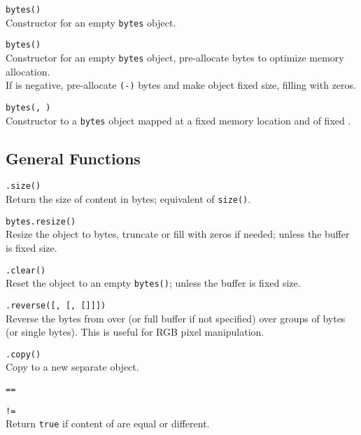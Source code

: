 \hangpar \texttt{bytes()}\\
Constructor for an empty \texttt{bytes} object.

\hangpar \texttt{bytes(}\texttt{)}\\
Constructor for an empty \texttt{bytes} object, pre-allocate  bytes to optimize memory allocation.\\
If  is negative, pre-allocate \texttt{(-}\texttt{)} bytes and make object fixed size, filling with zeros.

\hangpar \texttt{bytes(}\texttt{, }\texttt{)}\\
Constructor to a \texttt{bytes} object mapped at a fixed memory location  and of fixed . 

\subsection*{General Functions}

\hangpar {}\texttt{.size()}\\
Return the size of content in bytes; equivalent of \texttt{size(}\texttt{)}.

\hangpar \texttt{bytes.resize(}\texttt{)} \\
Resize the object to  bytes, truncate or fill with zeros if needed; unless the buffer is fixed size.

\hangpar {}\texttt{.clear()}\\
Reset the object to an empty \texttt{bytes()}; unless the buffer is fixed size.

\hangpar {}\texttt{.reverse([}\texttt{, [}\texttt{, [}\texttt{]]])}\\
Reverse the bytes from  over  (or full buffer if not specified) over groups of  bytes (or single bytes). This is useful for RGB pixel manipulation.

\hangpar {}\texttt{.copy()}\\
Copy to a new separate object.

\hangpar {}\texttt{==}

\hangpar {}\texttt{!=}\\
Return \texttt{true} if content of  are equal or different.

